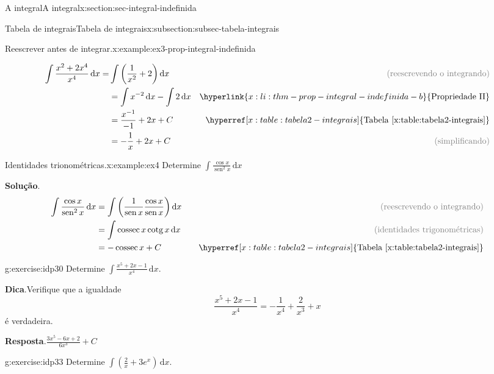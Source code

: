 \documentclass[oneside,10pt,]{article}
\newcommand{\blocktitlefont}{\relax}
\newcommand{\xreffont}{\relax}
\numberwithin{equation}{section}
\newcommand{\dd}{\mathrm{d}}
\newcommand{\integral}[2]{\displaystyle\int {#1}\,\dd {#2}}
\DeclareMathOperator{\sin}{sen}
\DeclareMathOperator{\csc}{cossec}
\DeclareMathOperator{\cot}{cotg}
\newcommand{\amp}{&}
\begin{document}
\begin{sectionptx}{A integral}{}{A integral}{}{}{x:section:sec-integral-indefinida}
\begin{subsectionptx}{Tabela de integrais}{}{Tabela de integrais}{}{}{x:subsection:subsec-tabela-integrais}
\begin{example}{Reescrever antes de integrar.}{x:example:ex3-prop-integral-indefinida}
\par\smallskip%
\noindent%
\begin{align*}
\integral{\frac{x^2+ 2x^4}{x^4}}{x} = \amp \integral{\left(\frac{1}{x^2}+2\right)}{x} \quad \amp \color{gray}{\text{(reescrevendo o integrando)}}\\
\amp =\integral{x^{-2}}{x}-\integral{2}{x} \amp \hyperlink{x:li:thm-prop-integral-indefinida-b}{\text{Propriedade II}}\\
\amp =\frac{x^{-1}}{-1}+2x + C  \amp \hyperref[x:table:tabela2-integrais]{\text{Tabela {\xreffont\ref{x:table:tabela2-integrais}}}}\\
\amp =-\frac{1}{x}+2x + C \amp \color{gray}{\text{(simplificando)}}
\end{align*}
%
%
\end{example}
\begin{example}{Identidades trionométricas.}{x:example:ex4}%
Determine \(\integral{\frac{\cos{x}}{\sin^2{x}}}{x}\)%
\par\smallskip%
\noindent\textbf{\blocktitlefont Solução}.\hypertarget{g:solution:idp29}{}\quad{}%
\begin{align*}
\integral{\frac{\cos{x}}{\sin^2{x}}}{x}\amp = \integral{\left(\frac{1}{\sin{x}}\frac{\cos{x}}{\sin{x}}\right)}{x} \quad \amp\color{gray}{\text{(reescrevendo o integrando)}}\\
\amp = \integral{\csc{x}\cot{x}}{x} \amp \color{gray}{\text{(identidades trigonométricas)}}\\
\amp = -\csc{x} + C \quad \amp \hyperref[x:table:tabela2-integrais]{\text{Tabela {\xreffont\ref{x:table:tabela2-integrais}}}}
\end{align*}
%
\end{example}
\begin{inlineexercise}{}{g:exercise:idp30}%
Determine \(\integral{\frac{x^5+ 2x-1}{x^4}}{x}\).%
\par\smallskip%
\noindent\textbf{\blocktitlefont Dica}.\hypertarget{g:hint:idp31}{}\quad{}Verifique que a igualdade%
\begin{equation*}
\frac{x^5+ 2x-1}{x^4}=-\frac{1}{x^4}+ \frac{2}{x^3} + x
\end{equation*}
é verdadeira.%
\par\smallskip%
\noindent\textbf{\blocktitlefont Resposta}.\hypertarget{g:answer:idp32}{}\quad{}\(\frac{3x^5-6x+2}{6x^3} + C\)%
\end{inlineexercise}%
\begin{inlineexercise}{}{g:exercise:idp33}%
Determine \(\integral{\left(\frac{2}{x}+3e^x\right)}{x}\).%

\end{inlineexercise}
\end{subsectionptx}
\end{sectionptx}
\end{document}
